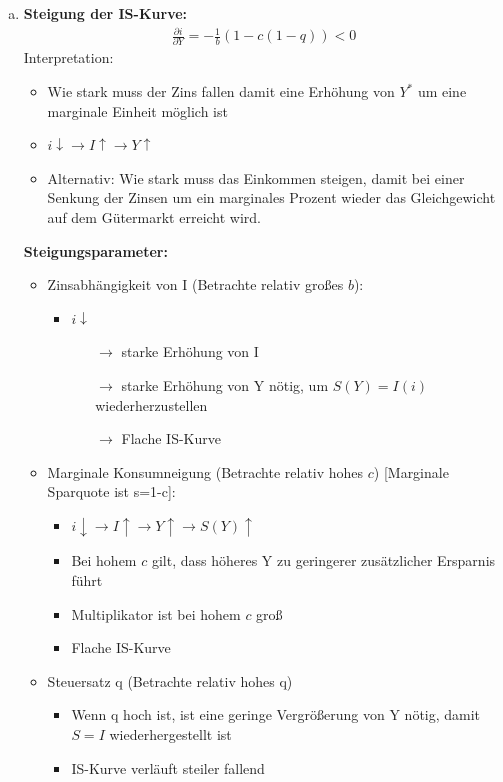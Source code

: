 \documentclass{scrartcl}
\begin{document}
\begin{enumerate}[(a)]
\item
\textbf{Steigung der IS-Kurve:}
\begin{align*}
  \frac{\partial i}{\partial Y} = -\frac{1}{b}(1-c(1-q))<0
\end{align*}
Interpretation:
\begin{itemize}
  \item Wie stark muss der Zins fallen damit eine Erh\"{o}hung von $Y^*$ um eine marginale Einheit m\"{o}glich ist
  \item $i\downarrow \rightarrow I\uparrow\rightarrow Y \uparrow$
  \item Alternativ: Wie stark muss das Einkommen steigen, damit bei einer Senkung der Zinsen um ein marginales Prozent wieder das Gleichgewicht auf dem G\"{u}termarkt erreicht wird.
\end{itemize}
\textbf{Steigungsparameter:}
\begin{itemize}
\item Zinsabh\"{a}ngigkeit von I (Betrachte relativ gro{\ss}es $b$):
\begin{itemize}
  \item $i\downarrow$
  \begin{itemize}
  \item[$\rightarrow$] starke Erh\"{o}hung von I
  \item[$\rightarrow$] starke Erh\"{o}hung von Y n\"{o}tig, um $S(Y)=I(i)$ wiederherzustellen
  \item[$\rightarrow$] Flache IS-Kurve
  \end{itemize}
\end{itemize}
\item Marginale Konsumneigung (Betrachte relativ hohes $c$) [Marginale Sparquote ist s=1-c]:
\begin{itemize}
  \item $i\downarrow\rightarrow I\uparrow \rightarrow Y\uparrow \rightarrow S(Y) \uparrow$
  \item Bei hohem $c$ gilt, dass h\"{o}heres Y zu geringerer zus\"{a}tzlicher Ersparnis f\"{u}hrt
  \item Multiplikator ist bei hohem $c$ gro{\ss}
  \item Flache IS-Kurve
\end{itemize}
\item Steuersatz q (Betrachte relativ hohes q)
\begin{itemize}
  \item Wenn q hoch ist, ist eine geringe Vergr\"{o}{\ss}erung von Y n\"{o}tig, damit $S=I$ wiederhergestellt ist
  \item IS-Kurve verl\"{a}uft steiler fallend

\end{itemize}
\end{itemize}
\end{enumerate}
\end{document}
